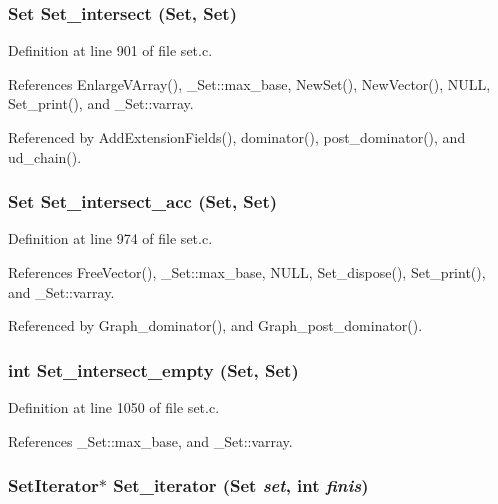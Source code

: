 \subsubsection{\setlength{\rightskip}{0pt plus 5cm}\bf{Set} Set\_\-intersect (\bf{Set}, \bf{Set})}\label{set_8h_725217e559eb2010b297063408aff7ed}




Definition at line 901 of file set.c.

References Enlarge\-VArray(), \_\-Set::max\_\-base, New\-Set(), New\-Vector(), NULL, Set\_\-print(), and \_\-Set::varray.

Referenced by Add\-Extension\-Fields(), dominator(), post\_\-dominator(), and ud\_\-chain().
\subsubsection{\setlength{\rightskip}{0pt plus 5cm}\bf{Set} Set\_\-intersect\_\-acc (\bf{Set}, \bf{Set})}\label{set_8h_cbd03d4b58dc568705bb45e2aff253e0}




Definition at line 974 of file set.c.

References Free\-Vector(), \_\-Set::max\_\-base, NULL, Set\_\-dispose(), Set\_\-print(), and \_\-Set::varray.

Referenced by Graph\_\-dominator(), and Graph\_\-post\_\-dominator().
\subsubsection{\setlength{\rightskip}{0pt plus 5cm}int Set\_\-intersect\_\-empty (\bf{Set}, \bf{Set})}\label{set_8h_d2c3680edf87d7d820632c70fe4f6319}




Definition at line 1050 of file set.c.

References \_\-Set::max\_\-base, and \_\-Set::varray.
\subsubsection{\setlength{\rightskip}{0pt plus 5cm}\bf{Set\-Iterator}$\ast$ Set\_\-iterator (\bf{Set} {\em set}, int {\em finis})}\label{set_8h_49b6b2407db8730bcc43f48e10b60130}




